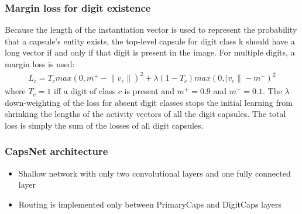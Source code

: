 \documentclass{beamer}
\begin{document}
\begin{frame}
\frametitle{Margin loss for digit existence}
Because the length of the instantiation vector is used to represent the probability that a capsule's entity exists, the top-level capsule for digit class k should have a long vector if and only if that digit is present in the image. For multiple digits, a margin loss is used:
\begin{equation}
\begin{split}
L_c = T_c max(0, m^+ - \lVert v_c \rVert)^2 + \lambda (1 - T_c) max(0, \lvert v_c \rVert - m^-)^2
\end{split}
\end{equation}
where \(T_c = 1\) iff a digit of class \(c\) is present and \(m^+ = 0.9\) and \(m^- = 0.1\). The \(\lambda\) down-weighting of the loss for absent digit classes stops the initial learning from shrinking the lengths of the activity vectors of all the digit capsules. The total loss is simply the sum of the losses of all digit capsules.
\end{frame}

\begin{frame}
\frametitle{CapsNet architecture}
\begin{figure}
	\subcapcentertrue
    \centering
    \end{figure}
   
\begin{itemize}
	\item Shallow network with only two convolutional layers and one fully connected layer
	\item Routing is implemented only between PrimaryCaps and DigitCaps layers
\end{itemize}    
\end{frame}
\end{document}
